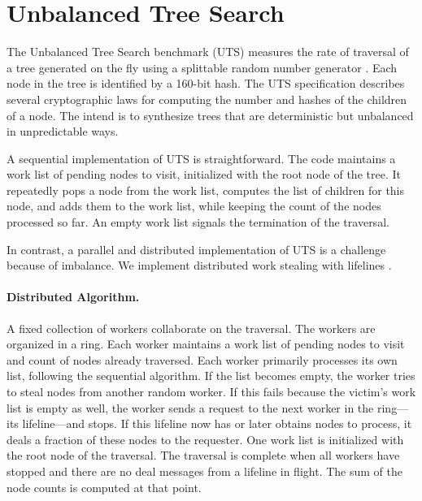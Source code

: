 \section{Unbalanced Tree Search}

The Unbalanced Tree Search benchmark (UTS) measures the rate of traversal of
a tree generated on the fly using a splittable random number
generator \cite{lcpc06}. Each node in the tree is identified by a 160-bit hash.
The UTS specification describes several cryptographic laws for computing the number and hashes of the children of a node.
The intend is to synthesize trees that are deterministic but unbalanced in unpredictable ways. 

A sequential implementation of UTS is straightforward. The code maintains a work list of pending nodes to visit, initialized with the root node of the tree. It repeatedly pops a node from the work list, computes the list of children for this node, and adds them to the work list, while keeping the count of the nodes processed so far. An empty work list signals the termination of the traversal.

In contrast, a parallel and distributed implementation of UTS is a challenge because of imbalance.
We implement distributed work stealing with lifelines \cite{ppopp11}.

\paragraph{Distributed Algorithm.} A fixed collection of workers collaborate on the traversal. The workers are organized in a ring.
Each worker maintains a work list of pending nodes to visit and count of nodes already traversed. Each worker primarily processes its own list, following the sequential algorithm. If the list becomes empty, the worker tries to steal nodes from another random worker. If this fails because the victim's work list is empty as well, the worker sends a request to the next worker in the ring---its lifeline---and stops. If this lifeline now has or later obtains nodes to process, it deals a fraction of these nodes to the requester. One work list is initialized with the root node of the traversal. The traversal is complete when all workers have stopped and there are no deal messages from a lifeline in flight. The sum of the node counts is computed at that point.

